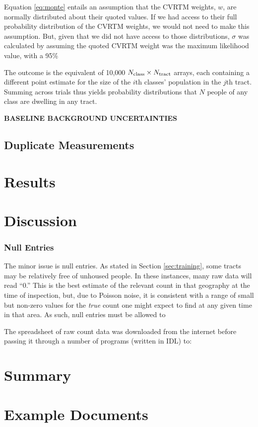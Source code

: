 \documentclass[11pt,twocolumn]{article}
\def\bfr{\bf\color{red}}
\begin{document}
Equation \ref{eq:monte} entails an assumption that the CVRTM weights, $w$, are normally distributed 
about their quoted values. If we had access to their full probability distribution of the CVRTM weights, we 
would not need to make this assumption. But, given that we did not have access to those distributions, $\sigma$
was calculated by assuming the quoted CVRTM weight was the maximum likelihood value, with a 95\%

The outcome is the equivalent of 10,000 $N_{\rm class}\times N_{\rm tract}$ arrays, each containing a different
point estimate for the size of the $i$th classes' population in the $j$th tract. Summing across trials thus
yields probability distributions that $N$ people of any class are dwelling in any tract.

{\bfr BASELINE BACKGROUND UNCERTAINTIES}

\subsection{Duplicate Measurements}
\label{sec:dupes}

\section{Results}
\label{sec:results}

\section{Discussion}
\label{sec:discussion}


\subsubsection{Null Entries}

The minor issue is null entries. As stated in Section \ref{sec:training}, some tracts may be 
relatively free of unhoused people. In these instances, many raw data will read ``0.'' This is
the best estimate of the relevant count in that geography at the time of inspection, but, due to 
Poisson noise, it is consistent with a range of small but non-zero values for the {\it true} count 
one might expect to find at any given time in that area. As such, null entries must be allowed 
to 

The spreadsheet of raw count data was downloaded from the internet before passing it through a number
of programs (written in IDL) to:


\section{Summary}
\label{sec:summary}

\appendix

\section{Example Documents}
\end{document}
